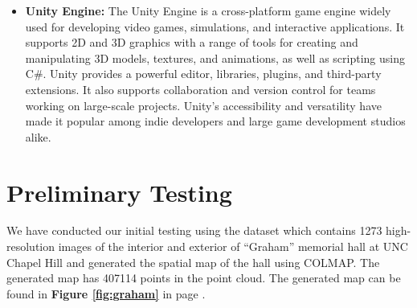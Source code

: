 \documentclass[sigconf]{acmart}
\begin{document}
\begin{itemize}
\item{\textbf{Unity Engine\cite{unityengine}: }
The Unity Engine is a cross-platform game engine widely used for developing video games, simulations, and interactive applications. It supports 2D and 3D graphics with a range of tools for creating and manipulating 3D models, textures, and animations, as well as scripting using C\#. Unity provides a powerful editor, libraries, plugins, and third-party extensions. It also supports collaboration and version control for teams working on large-scale projects. Unity's accessibility and versatility have made it popular among indie developers and large game development studios alike.}

\end{itemize}


\section{Preliminary Testing}
We have conducted our initial testing using the dataset which contains 1273 high-resolution images of the interior and exterior of “Graham” memorial hall at UNC Chapel Hill and generated the spatial map of the hall using COLMAP. The generated map has 407114 points in the point cloud. The generated map can be found in \textbf{Figure \ref{fig:graham}} in page \pageref{fig:graham}.
\end{document}
